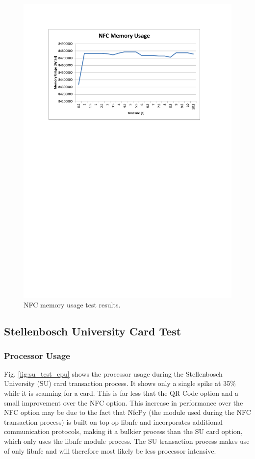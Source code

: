 \begin{figure}
 \centering 
 \includegraphics[clip=true, trim = 0 510 0 70,
 scale=0.7]{nfc_test_mem}
 \caption{NFC memory usage test results.}
 \label{fig:nfc_test_mem}
\end{figure}

\subsection{Stellenbosch University Card Test}

\subsubsection{Processor Usage}

Fig. \ref{fig:su_test_cpu} shows the processor usage during the Stellenbosch University
(SU) card transaction process. It shows only a single spike at 35\% while it is
scanning for a card. This is far less that the QR Code option and a small
improvement over the NFC option. This increase in performance over the NFC
option may be due to the fact that NfcPy (the module used during the NFC
transaction process) is built on top op libnfc and incorporates additional
communication protocols, making it a bulkier process than the SU card option,
which only uses the libnfc module process. The SU transaction process makes use
of only libnfc and will therefore most likely be less processor intensive.

